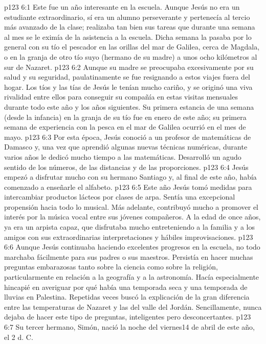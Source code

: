 \vs p123 6:1 Este fue un año interesante en la escuela. Aunque Jesús no era un estudiante extraordinario, sí era un alumno perseverante y pertenecía al tercio más avanzado de la clase; realizaba tan bien sus tareas que durante una semana al mes se le eximía de la asistencia a la escuela. Dicha semana la pasaba por lo general con su tío el pescador en las orillas del mar de Galilea, cerca de Magdala, o en la granja de otro tío suyo (hermano de su madre) a unos ocho kilómetros al sur de Nazaret.
\vs p123 6:2 Aunque su madre se preocupaba excesivamente por su salud y su seguridad, paulatinamente se fue resignando a estos viajes fuera del hogar. Los tíos y las tías de Jesús le tenían mucho cariño, y se originó una viva rivalidad entre ellos para conseguir su compañía en estas visitas mensuales durante todo este año y los años siguientes. Su primera estancia de una semana (desde la infancia) en la granja de su tío fue en enero de este año; su primera semana de experiencia con la pesca en el mar de Galilea ocurrió en el mes de mayo.
\vs p123 6:3 Por esta época, Jesús conoció a un profesor de matemáticas de Damasco y, una vez que aprendió algunas nuevas técnicas numéricas, durante varios años le dedicó mucho tiempo a las matemáticas. Desarrolló un agudo sentido de los números, de las distancias y de las proporciones.
\vs p123 6:4 Jesús empezó a disfrutar mucho con su hermano Santiago y, al final de este año, había comenzado a enseñarle el alfabeto.
\vs p123 6:5 Este año Jesús tomó medidas para intercambiar productos lácteos por clases de arpa. Sentía una excepcional propensión hacia todo lo musical. Más adelante, contribuyó mucho a promover el interés por la música vocal entre sus jóvenes compañeros. A la edad de once años, ya era un arpista capaz, que disfrutaba mucho entreteniendo a la familia y a los amigos con sus extraordinarias interpretaciones y hábiles improvisaciones.
\vs p123 6:6 Aunque Jesús continuaba haciendo excelentes progresos en la escuela, no todo marchaba fácilmente para sus padres o sus maestros. Persistía en hacer muchas preguntas embarazosas tanto sobre la ciencia como sobre la religión, particularmente en relación a la geografía y a la astronomía. Hacía especialmente hincapié en averiguar por qué había una temporada seca y una temporada de lluvias en Palestina. Repetidas veces buscó la explicación de la gran diferencia entre las temperaturas de Nazaret y las del valle del Jordán. Sencillamente, nunca dejaba de hacer este tipo de preguntas, inteligentes pero desconcertantes.
\vs p123 6:7 \pc Su tercer hermano, Simón, nació la noche del viernes14 de abril de este año, el 2 d. C.
